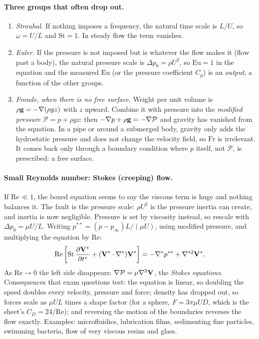 \paragraph{Three groups that often drop out.}
\begin{enumerate}[nosep,leftmargin=*]
\item \emph{Strouhal.} If nothing imposes a frequency, the natural time scale is $L/U$, so $\omega = U/L$ and $\mathrm{St} = 1$. In steady flow the term vanishes.
\item \emph{Euler.} If the pressure is not imposed but is whatever the flow makes it (flow past a body), the natural pressure scale is $\Delta p_0 = \rho U^2$, so $\mathrm{Eu} = 1$ in the equation and the measured $\mathrm{Eu}$ (or the pressure coefficient $C_p$) is an \emph{output}, a function of the other groups.
\item \emph{Froude, when there is no free surface.} Weight per unit volume is $\rho\mathbf{g} = -\nabla(\rho g z)$ with $z$ upward. Combine it with pressure into the \emph{modified pressure} $\mathcal{P} = p + \rho g z$: then $-\nabla p + \rho\mathbf{g} = -\nabla\mathcal{P}$ and gravity has vanished from the equation. In a pipe or around a submerged body, gravity only adds the hydrostatic pressure and does not change the velocity field, so $\mathrm{Fr}$ is irrelevant. It comes back only through a boundary condition where $p$ itself, not $\mathcal{P}$, is prescribed: a free surface.
\end{enumerate}

\paragraph{Small Reynolds number: Stokes (creeping) flow.} If $\mathrm{Re} \ll 1$, the boxed equation seems to say the viscous term is huge and nothing balances it. The fault is the pressure scale: $\rho U^2$ is the pressure inertia can create, and inertia is now negligible. Pressure is set by viscosity instead, so rescale with $\Delta p_0 = \mu U/L$. Writing $p^{**} = (p - p_\infty)L/(\mu U)$, using modified pressure, and multiplying the equation by $\mathrm{Re}$:
\[
\mathrm{Re}\left[\mathrm{St}\,\frac{\partial \mathbf{V}^*}{\partial t^*} + (\mathbf{V}^*\cdot\nabla^*)\mathbf{V}^*\right] = -\nabla^*p^{**} + \nabla^{*2}\mathbf{V}^* .
\]
As $\mathrm{Re} \to 0$ the left side disappears: $\nabla\mathcal{P} = \mu\nabla^2\mathbf{V}$, the \emph{Stokes equations}. Consequences that exam questions test: the equation is linear, so doubling the speed doubles every velocity, pressure and force; density has dropped out, so forces scale as $\mu U L$ times a shape factor (for a sphere, $F = 3\pi\mu U D$, which is the sheet's $C_D = 24/\mathrm{Re}$); and reversing the motion of the boundaries reverses the flow exactly. Examples: microfluidics, lubrication films, sedimenting fine particles, swimming bacteria, flow of very viscous resins and glass.

